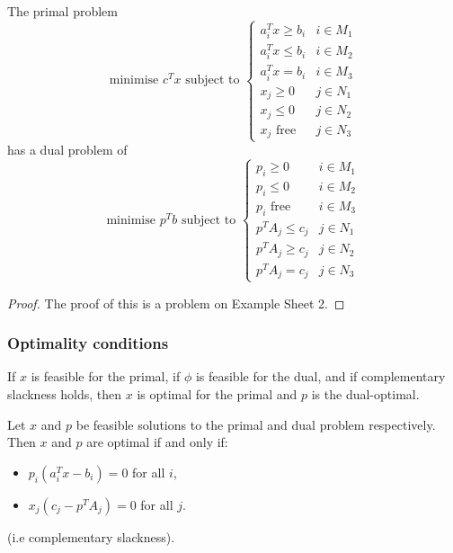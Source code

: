 \documentclass[a4paper]{scrartcl}
\begin{document}
\begin{proposition}
	 The primal problem 
	 \begin{equation*}
		  \text{minimise } c^Tx \text{ subject to } 
		  \begin{cases}
			  a_i^T x \geq b_i & i \in M_1 \\ 
			  a_i^T x \leq b_i & i \in M_2 \\ 
			  a_i^T x = b_i & i \in M_3 \\ 
			  x_j \geq 0 & j \in N_1\\
			  x_j \leq 0 & j \in N_2\\
			  x_j \text{ free } & j \in N_3
		  \end{cases}  
	 \end{equation*}
	 has a dual problem of 
	 \begin{equation*}
		\text{minimise } p^T b \text{ subject to } 
		\begin{cases}
			p_i \geq 0 & i \in M_1 \\ 
			p_i \leq 0 & i \in M_2 \\ 
			p_i \text{ free } & i \in M_3 \\ 
			p^T A_j \leq c_j & j \in N_1\\
			p^T A_j \geq c_j & j \in N_2\\
			p^T A_j = c_j & j \in N_3
		\end{cases}  
   \end{equation*}
\end{proposition}
\begin{proof}
	 The proof of this is a problem on Example Sheet 2.
\end{proof}
\subsubsection{Optimality conditions}
If $x$ is feasible for the primal, if $\phi$ is feasible for the dual, and if complementary slackness holds, then $x$ is optimal for the primal and $p$ is the dual-optimal.

\begin{theorem}
	 Let $x$ and $p$ be feasible solutions to the primal and dual problem respectively. Then $x$ and $p$ are optimal if and only if:
	 \begin{itemize}
		 \item $p_i (a_i^T x - b_i) =0 $ for all $i$,
		 \item $x_j(c_j-p^T A_j)=0$ for all $j$.
	 \end{itemize}
	 (i.e complementary slackness).
\end{theorem}
\end{document}
